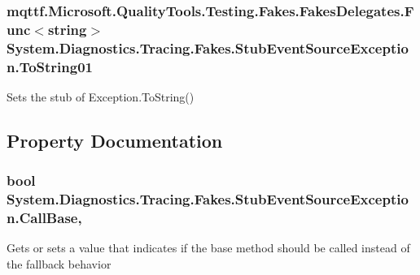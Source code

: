 \hypertarget{class_system_1_1_diagnostics_1_1_tracing_1_1_fakes_1_1_stub_event_source_exception_a3c3f4d465cbf7db4cc656201f1388b55}{
\subsubsection[{To\-String01}]{\setlength{\rightskip}{0pt plus 5cm}mqttf.\-Microsoft.\-Quality\-Tools.\-Testing.\-Fakes.\-Fakes\-Delegates.\-Func$<$string$>$ System.\-Diagnostics.\-Tracing.\-Fakes.\-Stub\-Event\-Source\-Exception.\-To\-String01}}\label{class_system_1_1_diagnostics_1_1_tracing_1_1_fakes_1_1_stub_event_source_exception_a3c3f4d465cbf7db4cc656201f1388b55}


Sets the stub of Exception.\-To\-String()



\subsection{Property Documentation}
\hypertarget{class_system_1_1_diagnostics_1_1_tracing_1_1_fakes_1_1_stub_event_source_exception_aa2e1a8432c9e229d58a90a872203da8d}{
\subsubsection[{Call\-Base}]{\setlength{\rightskip}{0pt plus 5cm}bool System.\-Diagnostics.\-Tracing.\-Fakes.\-Stub\-Event\-Source\-Exception.\-Call\-Base\hspace{0.3cm}{\ttfamily [get]}, {\ttfamily [set]}}}\label{class_system_1_1_diagnostics_1_1_tracing_1_1_fakes_1_1_stub_event_source_exception_aa2e1a8432c9e229d58a90a872203da8d}


Gets or sets a value that indicates if the base method should be called instead of the fallback behavior


